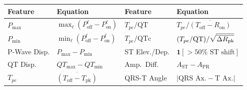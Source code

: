 \documentclass[border=4pt]{standalone}
\begin{document}
\scriptsize
\renewcommand{\arraystretch}{1.7}
\setlength{\tabcolsep}{1em}
\begin{tabular}{@{}ll@{\hskip 1.5em}|@{\hskip 1.5em}ll@{}}
  \toprule
  \textbf{Feature} & \textbf{Equation} & \textbf{Feature} & \textbf{Equation} \\
  \midrule
  $P_{\max}$ & $\max_\ell(P_{\text{off}}^\ell - P_{\text{on}}^\ell)$ &
  $T_{pe}/\text{QT}$ & $T_{pe} / \overline{(T_{\text{off}} - R_{\text{on}})}$ \\
  $P_{\min}$ & $\min_\ell(P_{\text{off}}^\ell - P_{\text{on}}^\ell)$ &
  $T_{pe}/\text{QTc}$ & $(T_{pe}/\text{QT}) / \sqrt{\smash[b]{\overline{\Delta R_{\text{pk}}}}}$ \\
  P-Wave Disp. & $P_{\max} - P_{\min}$ &
  ST Elev./Dep. & $\mathbf{1}[{>}50\%\text{ ST shift}]$ \\
  QT Disp. & $QT_{\max} - QT_{\min}$ &
  Amp.\ Diff. & $A_{\text{ST}} - A_{\text{PR}}$ \\
  $T_{pe}$ & $\overline{(T_{\text{off}} - T_{\text{pk}})}$ &
  QRS-T Angle & $|\text{QRS Ax.} - \text{T Ax.}|$ \\
  \bottomrule
\end{tabular}
\end{document}
